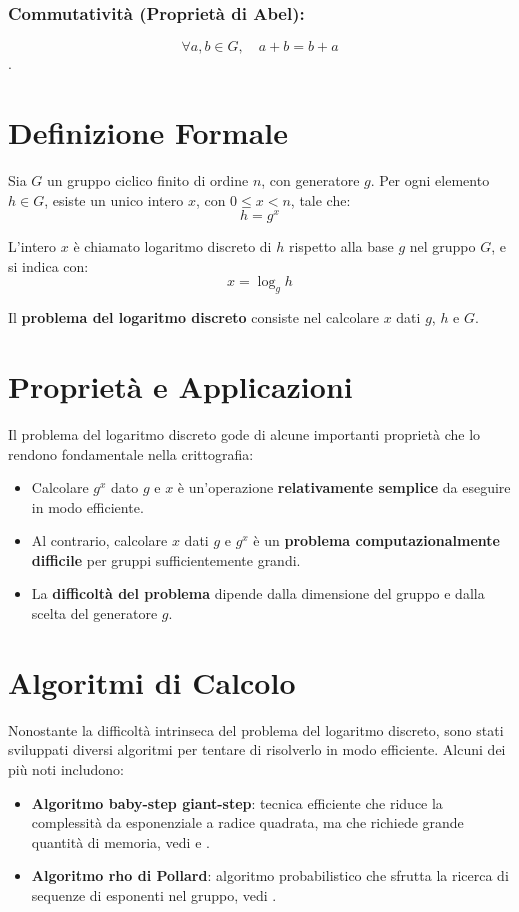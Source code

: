 \documentclass[a4paper,12pt]{report}
\begin{document}
\subsubsection*{Commutatività (Proprietà di Abel):} \[ \forall a, b \in  G, \quad a + b = b + a \].


\section{Definizione Formale}
Sia $G$ un gruppo ciclico finito di ordine $n$, con generatore $g$. Per ogni elemento $h \in G$, esiste un unico intero $x$, con $0 \leq x < n$, tale che:
\[h = g^x\]

L'intero $x$ è chiamato logaritmo discreto di $h$ rispetto alla base $g$ nel gruppo $G$, e si indica con:
\[x = \log_g h\]

Il \textbf{problema del logaritmo discreto} consiste nel calcolare $x$ dati $g$, $h$ e $G$. 

\section{Proprietà e Applicazioni}
Il problema del logaritmo discreto gode di alcune importanti proprietà che lo rendono fondamentale nella crittografia:

\begin{itemize}
    \item Calcolare $g^x$ dato $g$ e $x$ è un'operazione \textbf{relativamente semplice }da eseguire in modo efficiente.
    \item Al contrario, calcolare $x$ dati $g$ e $g^x$ è un \textbf{problema computazionalmente difficile} per gruppi sufficientemente grandi.
    \item La \textbf{difficoltà del problema} dipende dalla dimensione del gruppo e dalla scelta del generatore $g$.
\end{itemize}

\section{Algoritmi di Calcolo}
Nonostante la difficoltà intrinseca del problema del logaritmo discreto, sono stati sviluppati diversi algoritmi per tentare di risolverlo in modo efficiente. Alcuni dei più noti includono:
\begin{itemize}
    \item \textbf{Algoritmo baby-step giant-step}: tecnica efficiente che riduce la complessità da esponenziale a radice quadrata, ma che richiede grande quantità di memoria, vedi \cite{silverman2009elliptic} e \cite{coron2011baby}.
    \item \textbf{Algoritmo rho di Pollard}: algoritmo probabilistico che sfrutta la ricerca di sequenze di esponenti nel gruppo, vedi \cite{nickerson2020collision}.
\end{itemize}
\end{document}
